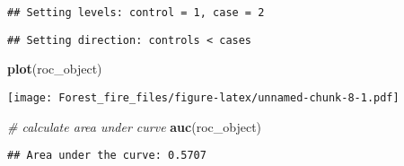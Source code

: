 \documentclass[
]{article}
\newenvironment{Shaded}{\begin{snugshade}}{\end{snugshade}}
\newcommand{\CommentTok}[1]{\textcolor[rgb]{0.56,0.35,0.01}{\textit{#1}}}
\newcommand{\FunctionTok}[1]{\textcolor[rgb]{0.13,0.29,0.53}{\textbf{#1}}}
\newcommand{\NormalTok}[1]{#1}
\newcommand{\OtherTok}[1]{\textcolor[rgb]{0.56,0.35,0.01}{#1}}
\newcommand{\SpecialCharTok}[1]{\textcolor[rgb]{0.81,0.36,0.00}{\textbf{#1}}}
\begin{document}
\begin{Shaded}
\end{Shaded}

\begin{verbatim}
## Setting levels: control = 1, case = 2
\end{verbatim}

\begin{verbatim}
## Setting direction: controls < cases
\end{verbatim}

\begin{Shaded}
\begin{Highlighting}[]
\FunctionTok{plot}\NormalTok{(roc\_object)}
\end{Highlighting}
\end{Shaded}

\texttt{[image: Forest\_fire\_files/figure-latex/unnamed-chunk-8-1.pdf]}

\begin{Shaded}
\begin{Highlighting}[]
\CommentTok{\# calculate area under curve}
\FunctionTok{auc}\NormalTok{(roc\_object)}
\end{Highlighting}
\end{Shaded}

\begin{verbatim}
## Area under the curve: 0.5707
\end{verbatim}
\end{document}

